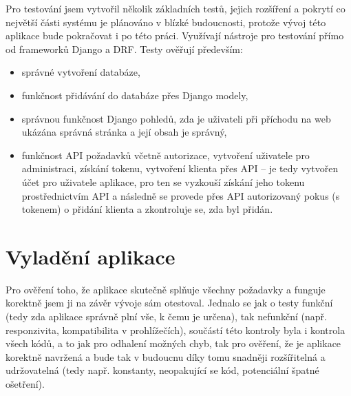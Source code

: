     Pro testování jsem vytvořil několik základních testů, jejich rozšíření a pokrytí co největší části systému je plánováno v blízké budoucnosti, protože vývoj této aplikace bude pokračovat i po této práci. Využívají nástroje pro testování přímo od frameworků Django a DRF. Testy ověřují především:
        \begin{itemize}
            \item správné vytvoření databáze,
            \item funkčnost přidávání do databáze přes Django modely,
            \item správnou funkčnost Django pohledů, zda je uživateli při příchodu na web ukázána správná stránka a její obsah je správný,
            \item funkčnost API požadavků včetně autorizace, vytvoření uživatele pro administraci, získání tokenu, vytvoření klienta přes API -- je tedy vytvořen účet pro uživatele aplikace, pro ten se vyzkouší získání jeho tokenu prostřednictvím API a následně se provede přes API autorizovaný pokus (s tokenem) o přidání klienta a zkontroluje se, zda byl přidán.
        \end{itemize}

    \section{Vyladění aplikace}
    Pro ověření toho, že aplikace skutečně splňuje všechny požadavky a funguje korektně jsem ji na závěr vývoje sám otestoval. Jednalo se jak o testy funkční (tedy zda aplikace správně plní vše, k čemu je určena), tak nefunkční (např. responzivita, kompatibilita v prohlížečích), součástí této kontroly byla i kontrola všech kódů, a to jak pro odhalení možných chyb, tak pro ověření, že je aplikace korektně navržená a bude tak v budoucnu díky tomu snadněji rozšířitelná a udržovatelná (tedy např. konstanty, neopakující se kód, potenciální špatné ošetření).
    
